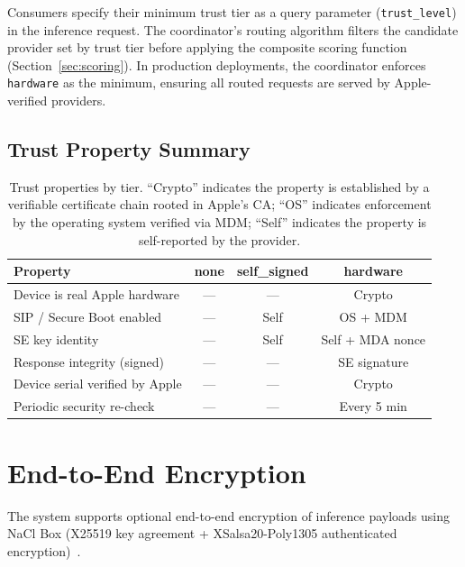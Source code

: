 \documentclass[10pt,twocolumn,letterpaper]{article}
\begin{document}
Consumers specify their minimum trust tier as a query parameter (\texttt{trust\_level}) in the inference request. The coordinator's routing algorithm filters the candidate provider set by trust tier before applying the composite scoring function (Section~\ref{sec:scoring}). In production deployments, the coordinator enforces \texttt{hardware} as the minimum, ensuring all routed requests are served by Apple-verified providers.

\subsection{Trust Property Summary}

\begin{table}[h]
\centering
\caption{Trust properties by tier. ``Crypto'' indicates the property is established by a verifiable certificate chain rooted in Apple's CA; ``OS'' indicates enforcement by the operating system verified via MDM; ``Self'' indicates the property is self-reported by the provider.}
\label{tab:tier-comparison}
\vspace{4pt}
\scriptsize
\begin{tabular}{@{}lccc@{}}
\toprule
\textbf{Property} & \textbf{none} & \textbf{self\_signed} & \textbf{hardware} \\
\midrule
Device is real Apple hardware & --- & --- & Crypto \\
SIP / Secure Boot enabled & --- & Self & OS + MDM \\
SE key identity & --- & Self & Self + MDA nonce \\
Response integrity (signed) & --- & --- & SE signature \\
Device serial verified by Apple & --- & --- & Crypto \\
Periodic security re-check & --- & --- & Every 5 min \\
\bottomrule
\end{tabular}
\end{table}

\section{End-to-End Encryption}
\label{sec:e2e}

The system supports optional end-to-end encryption of inference payloads using NaCl Box (X25519 key agreement + XSalsa20-Poly1305 authenticated encryption)~\cite{nacl}.
\end{document}
